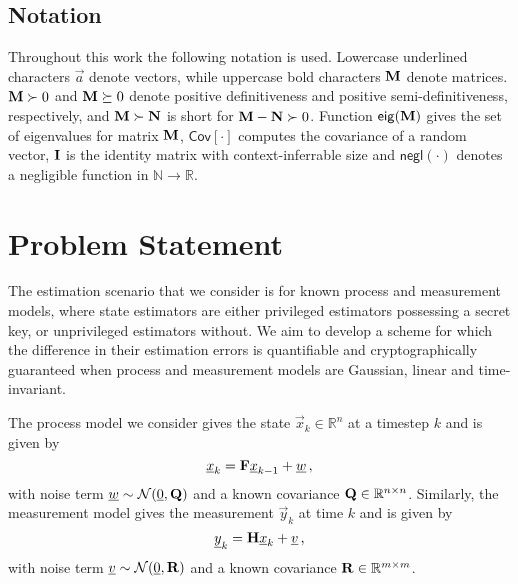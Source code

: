 \documentclass[conference]{IEEEtran}
\theoremstyle{definition}
\theoremstyle{definition}
\theoremstyle{remark}
\begin{document}
\subsection{Notation}
Throughout this work the following notation is used. Lowercase underlined characters $\vec{a}$ denote vectors, while uppercase bold characters ${{\mathbf{M}}}$ denote matrices. ${{\mathbf{M}}}\succ 0$ and ${{\mathbf{M}}} \succeq 0$ denote positive definitiveness and positive semi-definitiveness, respectively, and ${{\mathbf{M}}} \succ {\ensuremath{{\mathbf{N}}}}$ is short for ${{\mathbf{M}}}-{{\mathbf{N}}}\succ 0$. Function $\mathsf{eig}({{\mathbf{M}}})$ gives the set of eigenvalues for matrix ${{\mathbf{M}}}$, $\mathsf{Cov}[\cdot]$ computes the covariance of a random vector, ${{\mathbf{I}}}$ is the identity matrix with context-inferrable size and $\mathsf{negl}(\cdot)$ denotes a negligible function in $\mathbb{N}\rightarrow\mathbb{R}$.

% 
%                                              
%                                              
%                                              
% 

\section{Problem Statement}\label{sec:problem_statement}
The estimation scenario that we consider is for known process and measurement models, where state estimators are either privileged estimators possessing a secret key, or unprivileged estimators without. We aim to develop a scheme for which the difference in their estimation errors is quantifiable and cryptographically guaranteed when process and measurement models are Gaussian, linear and time-invariant.

The process model we consider gives the state $\vec{x}_k\in\mathbb{R}^n$ at a timestep $k$ and is given by
\begin{equation}\label{eqn:linear_process_model}
   \vec{x}_k = \mat{F}\vec{x}_{k-1} + \vec{w}\,,
\end{equation}
with noise term ${\underline{w}}\sim \mathcal{N}({\underline{0}}, {{\mathbf{Q}}})$ and a known covariance ${{\mathbf{Q}}}\in \mathbb{R}^{n\times n}$. Similarly, the measurement model gives the measurement $\vec{y}_k$ at time $k$ and is given by
\begin{equation}\label{eqn:linear_measurement_model}
   \vec{y}_k = \mat{H}\vec{x}_k + \vec{v}\,,
\end{equation}
with noise term ${\underline{v}}\sim \mathcal{N}({\underline{0}}, {{\mathbf{R}}})$ and a known covariance ${{\mathbf{R}}}\in \mathbb{R}^{m\times m}$.
\end{document}

